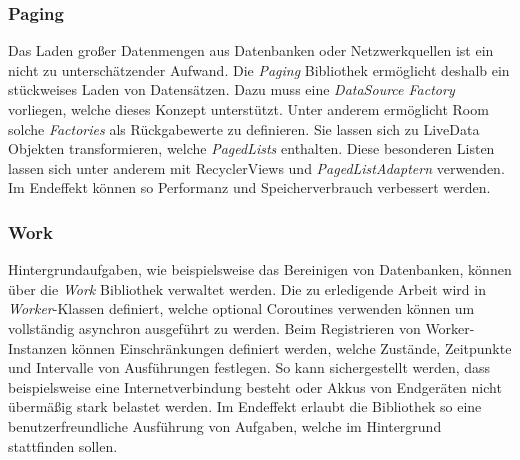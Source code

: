 \subsubsection{Paging}
\label{subsubsec:app:jetpack:paging}
Das Laden großer Datenmengen aus Datenbanken oder Netzwerkquellen ist ein nicht zu unterschätzender Aufwand.
Die \textit{Paging} Bibliothek ermöglicht deshalb ein stückweises Laden von Datensätzen.
Dazu muss eine \textit{DataSource Factory} vorliegen, welche dieses Konzept unterstützt.
Unter anderem ermöglicht Room solche \textit{Factories} als Rückgabewerte zu definieren.
Sie lassen sich zu LiveData Objekten transformieren, welche \textit{PagedLists} enthalten.
Diese besonderen Listen lassen sich unter anderem mit RecyclerViews und \textit{PagedListAdaptern} verwenden.
Im Endeffekt können so Performanz und Speicherverbrauch verbessert werden.

\subsubsection{Work}
\label{subsubsec:app:jetpack:work}
Hintergrundaufgaben, wie beispielsweise das Bereinigen von Datenbanken, können über die \textit{Work} Bibliothek verwaltet werden.
Die zu erledigende Arbeit wird in \textit{Worker}-Klassen definiert, welche optional Coroutines verwenden können um vollständig asynchron ausgeführt zu werden.
Beim Registrieren von Worker-Instanzen können Einschränkungen definiert werden, welche Zustände, Zeitpunkte und Intervalle von Ausführungen festlegen.
So kann sichergestellt werden, dass beispielsweise eine Internetverbindung besteht oder Akkus von Endgeräten nicht übermäßig stark belastet werden.
Im Endeffekt erlaubt die Bibliothek so eine benutzerfreundliche Ausführung von Aufgaben, welche im Hintergrund stattfinden sollen.

